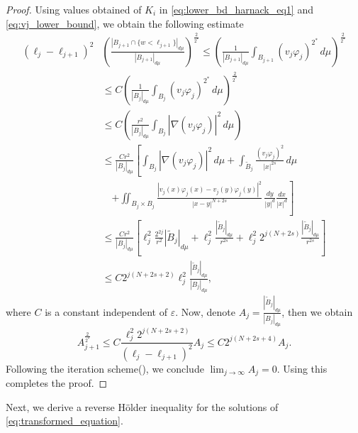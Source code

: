 \documentclass[11pt]{article}
\begin{document}
\begin{proof}
Using values obtained of $K_i$ in \eqref{eq:lower_bd_harnack_eq1} and \eqref{eq:vj_lower_bound}, we obtain the following estimate
\begin{align*}
 (\ell_j -  \ell_{j+1})^2 
&\left( \frac{| B_{j+1} \cap \{ w < \ell_{j+1}  \}|_{d\mu}}{|B_{j+1}|_{d\mu}}   \right)^{\frac{2}{2^*}} \leq \left( \frac{1}{|B_{j+1}|_{d\mu}} \int_{B_{j+1}} (v_j \varphi_j)^{2^*} \, d\mu \right)^{\frac{2}{2^*}} \\
&   \leq  C\left( \frac{1}{|B_{j}|_{d\mu}} \int_{B_{j}} (v_j \varphi_j)^{2^*} \, d\mu \right)^{\frac{2}{2^*}} \\
& \leq C \left( \frac{r^2}{|B_j|_{d\mu}} \int_{B_j} |\nabla(v_j \varphi_j)|^2 \, d\mu \right)\\
&\leq \frac{C r^2}{|B_j|_{d\mu}} \left[ 
\int_{B_j} |\nabla(v_j \varphi_j)|^2 \, d\mu 
+   \int_{\widetilde{B}_j} \frac{(v_j \varphi_j)^2}{|x|^{2s}} \, d\mu 
\right. \\
& \quad \left.+ \iint_{B_j \times B_j} \frac{|v_j(x) \varphi_j(x) - v_j(y) \varphi_j(y)|^2}
{|x - y|^{N+2s}} \, \frac{dy}{|y|^{d}} \frac{dx}{|x|^{d}}
\right]\\
& \leq \frac{C r^2}{|B_j|_{d\mu}} \left[ 
\ell_j^2   \frac{2^{2j}}{r^2}   |\widetilde{B}_j|_{d\mu} 
+  \ell_j^2   \frac{|\widetilde{B}_j|_{d\mu}}{r^{2s}} 
+  \ell_j^2   2^{j(N+2s)}   \frac{|\widetilde{B}_j|_{d\mu}}{  r^{2s}} 
\right]\\
& \leq C   2^{j(N+2s + 2)}   \ell_j^2   
\frac{\left| \widetilde{B}_j  \right|_{d\mu}}{|B_j|_{d\mu}},
\end{align*}
where $C$ is a constant independent of $\varepsilon$.
Now, denote $A_j = \frac{\left| \widetilde{B}_j  \right|_{d\mu}}{|B_j|_{d\mu}}$, then we obtain
\begin{equation*}
A_{j+1}^{\frac{2}{2^*}} \leq C   \frac{\ell_j^2   2^{j(N+2s + 2)}}{(\ell_j - \ell_{j+1})^2}   A_j \leq C 2^{j(N+2s + 4)}   A_j.
\end{equation*}
Following the iteration scheme(\cite[Lemma $7.1$]{giusti2003iteration_lemma}), we conclude $\lim_{j \to \infty} A_j = 0$. Using this completes the proof.
\end{proof}
Next, we derive a reverse H\"{o}lder inequality for the solutions of \eqref{eq:transformed_equation}.
\end{document}
